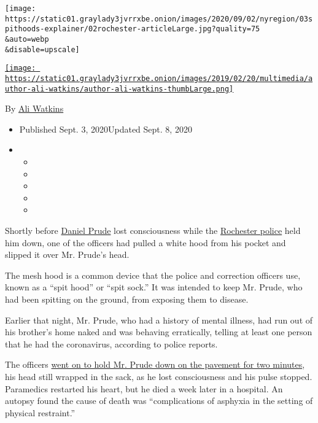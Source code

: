 \texttt{[image: https://static01.graylady3jvrrxbe.onion/images/2020/09/02/nyregion/03spithoods-explainer/02rochester-articleLarge.jpg?quality=75\\\&auto=webp\\\&disable=upscale]}

\href{https://www.nytimes3xbfgragh.onion/by/ali-watkins}{\texttt{[image: https://static01.graylady3jvrrxbe.onion/images/2019/02/20/multimedia/author-ali-watkins/author-ali-watkins-thumbLarge.png]}}

By \href{https://www.nytimes3xbfgragh.onion/by/ali-watkins}{Ali Watkins}

\begin{itemize}
\item
  Published Sept. 3, 2020Updated Sept. 8, 2020
\item
  \begin{itemize}
  \item
  \item
  \item
  \item
  \item
  \end{itemize}
\end{itemize}

Shortly before
\href{https://www.nytimes3xbfgragh.onion/2020/09/03/nyregion/daniel-prude-police-rochester.html}{Daniel
Prude} lost consciousness while the
\href{https://www.nytimes3xbfgragh.onion/2020/09/08/nyregion/rochester-police-chief-resigns-prude.html}{Rochester
police} held him down, one of the officers had pulled a white hood from
his pocket and slipped it over Mr. Prude's head.

The mesh hood is a common device that the police and correction officers
use, known as a ``spit hood'' or ``spit sock.'' It was intended to keep
Mr. Prude, who had been spitting on the ground, from exposing them to
disease.

Earlier that night, Mr. Prude, who had a history of mental illness, had
run out of his brother's home naked and was behaving erratically,
telling at least one person that he had the coronavirus, according to
police reports.

The officers
\href{https://www.nytimes3xbfgragh.onion/2020/09/03/nyregion/daniel-prude-police-rochester.html}{went
on to hold Mr. Prude down on the pavement for two minutes}, his head
still wrapped in the sack, as he lost consciousness and his pulse
stopped. Paramedics restarted his heart, but he died a week later in a
hospital. An autopsy found the cause of death was ``complications of
asphyxia in the setting of physical restraint.''

